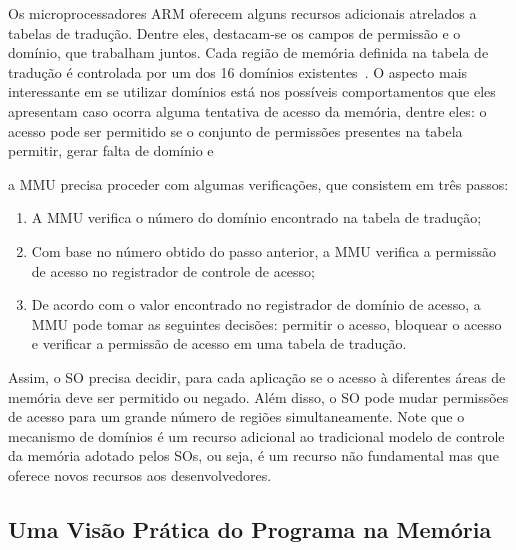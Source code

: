 Os microprocessadores ARM oferecem alguns recursos adicionais atrelados a
tabelas de tradução. Dentre eles, destacam-se os campos de permissão e o
domínio, que trabalham juntos. Cada região de memória definida na tabela de
tradução é controlada por um dos 16 domínios
existentes~\citep{armdeveloperguide}.  O aspecto mais interessante em se
utilizar domínios está nos possíveis comportamentos que eles apresentam caso ocorra alguma
tentativa de acesso da memória, dentre eles: o acesso pode ser permitido se o
conjunto de permissões presentes na tabela permitir, gerar falta de domínio e 

 a MMU precisa proceder com algumas verificações, que
consistem em três passos:

\begin{enumerate}
  \item A MMU verifica o número do domínio encontrado na tabela de tradução;
  \item Com base no número obtido do passo anterior, a MMU verifica a permissão
        de acesso no registrador de controle de acesso;
  \item De acordo com o valor encontrado no registrador de domínio de acesso, a
        MMU pode tomar as seguintes decisões: permitir o acesso, bloquear o
        acesso e verificar a permissão de acesso em uma tabela de tradução.
\end{enumerate}

Assim, o SO precisa decidir, para cada aplicação se o acesso à diferentes áreas
de memória deve ser permitido ou negado.  Além disso, o SO pode mudar
permissões de acesso para um grande número de regiões simultaneamente. Note que o
mecanismo de domínios é um recurso adicional ao tradicional modelo de controle
da memória adotado pelos SOs, ou seja, é um recurso não fundamental mas que
oferece novos recursos aos desenvolvedores.

\subsection{Uma Visão Prática do Programa na Memória}
\label{sec:visao_pratica_mem}

